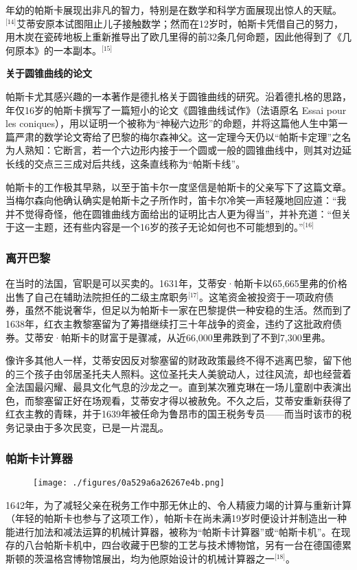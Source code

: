 年幼的帕斯卡展现出非凡的智力，特别是在数学和科学方面展现出惊人的天赋。\(^\text{[14]}\)艾蒂安原本试图阻止儿子接触数学；然而在12岁时，帕斯卡凭借自己的努力，用木炭在瓷砖地板上重新推导出了欧几里得的前32条几何命题，因此他得到了《几何原本》的一本副本。\(^\text{[15]}\)

\textbf{关于圆锥曲线的论文}

帕斯卡尤其感兴趣的一本著作是德扎格关于圆锥曲线的研究。沿着德扎格的思路，年仅16岁的帕斯卡撰写了一篇短小的论文《圆锥曲线试作》（法语原名 Essai pour les coniques），用以证明一个被称为“神秘六边形”的命题，并将这篇他人生中第一篇严肃的数学论文寄给了巴黎的梅尔森神父。这一定理今天仍以“帕斯卡定理”之名为人熟知：它断言，若一个六边形内接于一个圆或一般的圆锥曲线中，则其对边延长线的交点三三成对后共线，这条直线称为“帕斯卡线”。

帕斯卡的工作极其早熟，以至于笛卡尔一度坚信是帕斯卡的父亲写下了这篇文章。当梅尔森向他确认确实是帕斯卡之子所作时，笛卡尔冷笑一声轻蔑地回应道：“我并不觉得奇怪，他在圆锥曲线方面给出的证明比古人更为得当”，并补充道：“但关于这一主题，还有些内容是一个16岁的孩子无论如何也不可能想到的。”\(^\text{[16]}\)
\subsubsection{离开巴黎}
在当时的法国，官职是可以买卖的。1631年，艾蒂安·帕斯卡以65,665里弗的价格出售了自己在辅助法院担任的二级主席职务\(^\text{[17]}\)。这笔资金被投资于一项政府债券，虽然不能说奢华，但足以为帕斯卡一家在巴黎提供一种安稳的生活。然而到了1638年，红衣主教黎塞留为了筹措继续打三十年战争的资金，违约了这批政府债券。艾蒂安·帕斯卡的财富于是骤减，从近66,000里弗跌到了不到7,300里弗。

像许多其他人一样，艾蒂安因反对黎塞留的财政政策最终不得不逃离巴黎，留下他的三个孩子由邻居圣托夫人照料。这位圣托夫人美貌动人，过往风流，却也经营着全法国最闪耀、最具文化气息的沙龙之一。直到某次雅克琳在一场儿童剧中表演出色，而黎塞留正好在场观看，艾蒂安才得以被赦免。不久之后，艾蒂安重新获得了红衣主教的青睐，并于1639年被任命为鲁昂市的国王税务专员——而当时该市的税务记录由于多次民变，已是一片混乱。
\subsubsection{帕斯卡计算器}
\begin{figure}[ht]
\centering
\texttt{[image: ./figures/0a529a6a26267e4b.png]}
\caption{} \label{fig_BLSpsk_2}
\end{figure}
1642年，为了减轻父亲在税务工作中那无休止的、令人精疲力竭的计算与重新计算（年轻的帕斯卡也参与了这项工作），帕斯卡在尚未满19岁时便设计并制造出一种能进行加法和减法运算的机械计算器，被称为“帕斯卡计算器”或“帕斯卡机”。在现存的八台帕斯卡机中，四台收藏于巴黎的工艺与技术博物馆，另有一台在德国德累斯顿的茨温格宫博物馆展出，均为他原始设计的机械计算器之一\(^\text{[18]}\)。

